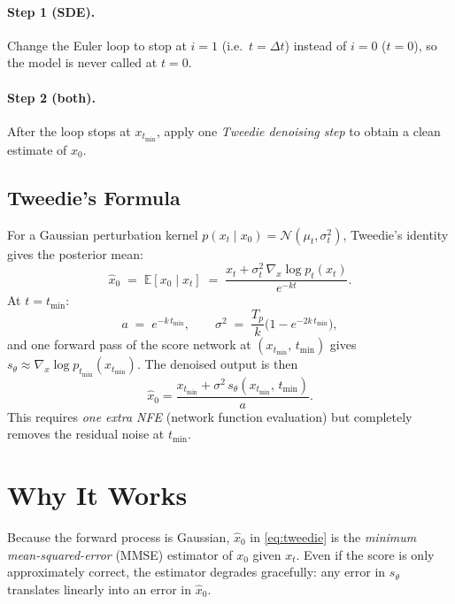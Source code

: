 \documentclass[11pt]{article}
\begin{document}
\paragraph{Step 1 (SDE).} Change the Euler loop to stop at $i = 1$ (i.e.\ $t = \Delta t$)
instead of $i = 0$ ($t = 0$), so the model is never called at $t = 0$.

\paragraph{Step 2 (both).} After the loop stops at $x_{t_{\min}}$,
apply one \emph{Tweedie denoising step} to obtain a clean estimate of $x_0$.

\subsection{Tweedie's Formula}

For a Gaussian perturbation kernel $p(x_t \mid x_0) = \mathcal{N}(\mu_t, \sigma_t^2)$,
Tweedie's identity gives the posterior mean:
\begin{equation}
\hat{x}_0 \;=\; \mathbb{E}[x_0 \mid x_t]
\;=\; \frac{x_t + \sigma_t^2\,\nabla_x \log p_t(x_t)}{e^{-kt}}.
\label{eq:tweedie}
\end{equation}
At $t = t_{\min}$:
\begin{equation}
a \;=\; e^{-k\,t_{\min}}, \qquad
\sigma^2 \;=\; \frac{T_p}{k}\bigl(1 - e^{-2k\,t_{\min}}\bigr),
\end{equation}
and one forward pass of the score network at $(x_{t_{\min}},\, t_{\min})$ gives
$s_\theta \approx \nabla_x \log p_{t_{\min}}(x_{t_{\min}})$.
The denoised output is then
\begin{equation}
\hat{x}_0 = \frac{x_{t_{\min}} + \sigma^2\, s_\theta(x_{t_{\min}},\, t_{\min})}{a}.
\end{equation}
This requires \emph{one extra NFE} (network function evaluation) but completely
removes the residual noise at $t_{\min}$.

\section{Why It Works}

Because the forward process is Gaussian, $\hat{x}_0$ in \eqref{eq:tweedie}
is the \emph{minimum mean-squared-error} (MMSE) estimator of $x_0$ given $x_t$.
Even if the score is only approximately correct, the estimator degrades gracefully:
any error in $s_\theta$ translates linearly into an error in $\hat{x}_0$.
\end{document}
